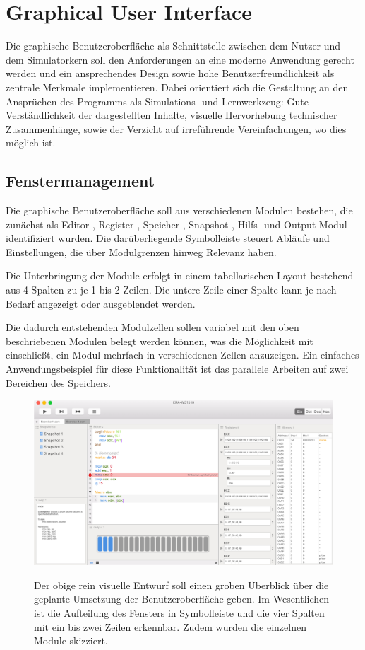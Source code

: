 \chapter{Graphical User Interface}

Die graphische Benutzeroberfläche als Schnittstelle zwischen dem Nutzer und dem Simulatorkern soll den Anforderungen an eine moderne Anwendung gerecht werden und ein ansprechendes Design sowie hohe Benutzerfreundlichkeit als zentrale Merkmale implementieren. Dabei orientiert sich die Gestaltung an den Ansprüchen des Programms als Simulations- und Lernwerkzeug: Gute Verständlichkeit der dargestellten Inhalte, visuelle Hervorhebung technischer Zusammenhänge, sowie der Verzicht auf irreführende Vereinfachungen, wo dies möglich ist.


\section{Fenstermanagement}

Die graphische Benutzeroberfläche soll aus verschiedenen Modulen bestehen, die zunächst als Editor-, Register-, Speicher-, Snapshot-, Hilfs- und Output-Modul identifiziert wurden. Die darüberliegende Symbolleiste steuert Abläufe und Einstellungen, die über Modulgrenzen hinweg Relevanz haben.

Die Unterbringung der Module erfolgt in einem tabellarischen Layout bestehend aus 4 Spalten zu je 1 bis 2 Zeilen. Die untere Zeile einer Spalte kann je nach Bedarf angezeigt oder ausgeblendet werden.

Die dadurch entstehenden Modulzellen sollen variabel mit den oben beschriebenen Modulen belegt werden können, was die Möglichkeit mit einschließt, ein Modul mehrfach in verschiedenen Zellen anzuzeigen. Ein einfaches Anwendungsbeispiel für diese Funktionalität ist das parallele Arbeiten auf zwei Bereichen des Speichers.

\begin{figure}
  \includegraphics[width=\textwidth]{../ui/figures/mockup}
  \label{fig:Mockup}
  \caption{Der obige rein visuelle Entwurf soll einen groben Überblick über die geplante Umsetzung der Benutzeroberfläche geben. Im Wesentlichen ist die Aufteilung des Fensters in Symbolleiste und die vier Spalten mit ein bis zwei Zeilen erkennbar. Zudem wurden die einzelnen Module skizziert.}
\end{figure}

